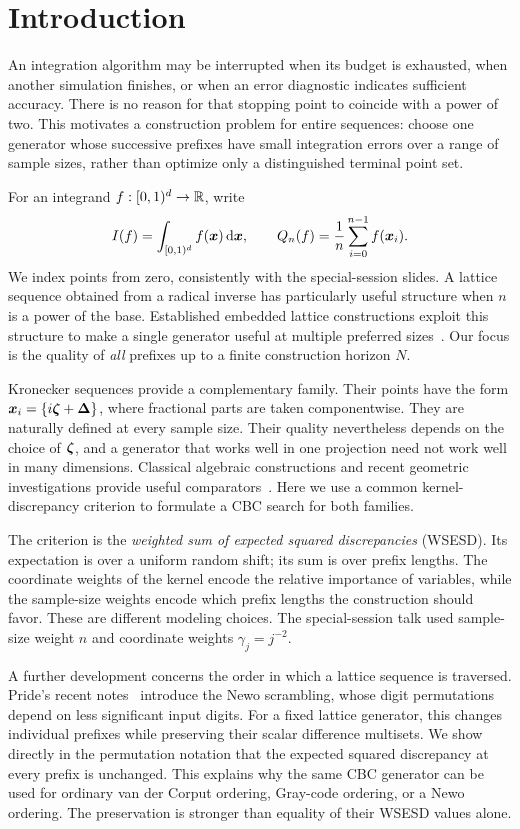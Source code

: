 \section{Introduction}\label{sec:introduction}
An integration algorithm may be interrupted when its budget is exhausted,
when another simulation finishes, or when an error diagnostic indicates
sufficient accuracy. There is no reason for that stopping point to coincide
with a power of two. This motivates a construction problem for entire
sequences: choose one generator whose successive prefixes have small
integration errors over a range of sample sizes, rather than optimize only
a distinguished terminal point set.

For an integrand $f:[0,1)^d\to\mathbb{R}$, write
\[
 I(f)=\int_{[0,1)^d} f(\boldsymbol{x})\,\mathrm{d}\boldsymbol{x},
 \qquad Q_n(f)=\frac1n\sum_{i=0}^{n-1}f(\boldsymbol{x}_i).
\]
We index points from zero, consistently with the special-session slides.
A lattice sequence obtained from a radical inverse has particularly useful
structure when $n$ is a power of the base. Established embedded lattice
constructions exploit this structure to make a single generator useful at
multiple preferred sizes~\cite{CKN06,DKP22}. Our focus is the quality of
\emph{all} prefixes up to a finite construction horizon $N$.

Kronecker sequences provide a complementary family. Their points have the
form $\boldsymbol{x}_i=\{i\boldsymbol{\zeta}+\boldsymbol{\Delta}\}$, where fractional parts are taken
componentwise. They are naturally defined at every sample size. Their
quality nevertheless depends on the choice of $\boldsymbol{\zeta}$, and a generator that
works well in one projection need not work well in many dimensions.
Classical algebraic constructions and recent geometric investigations provide
useful comparators~\cite{Richtmyer51,DGLPS25}. Here we use a common
kernel-discrepancy criterion to formulate a CBC search for both families.

The criterion is the \emph{weighted sum of expected squared discrepancies}
(WSESD). Its expectation is over a uniform random shift; its sum is over
prefix lengths. The coordinate weights of the kernel encode the relative
importance of variables, while the sample-size weights encode which prefix
lengths the construction should favor. These are different modeling choices.
The special-session talk used sample-size weight $n$ and coordinate weights
$\gamma_j=j^{-2}$.

A further development concerns the order in which a lattice sequence is
traversed. Pride's recent notes~\cite{pride-notes} introduce the Newo
scrambling, whose digit permutations depend on less significant input digits.
For a fixed lattice generator, this changes individual prefixes while
preserving their scalar difference multisets. We show directly in the
permutation notation that the expected squared discrepancy at every prefix
is unchanged. This explains why the same CBC generator can be used for
ordinary van der Corput ordering, Gray-code ordering, or a Newo ordering.
The preservation is stronger than equality of their WSESD values alone.


